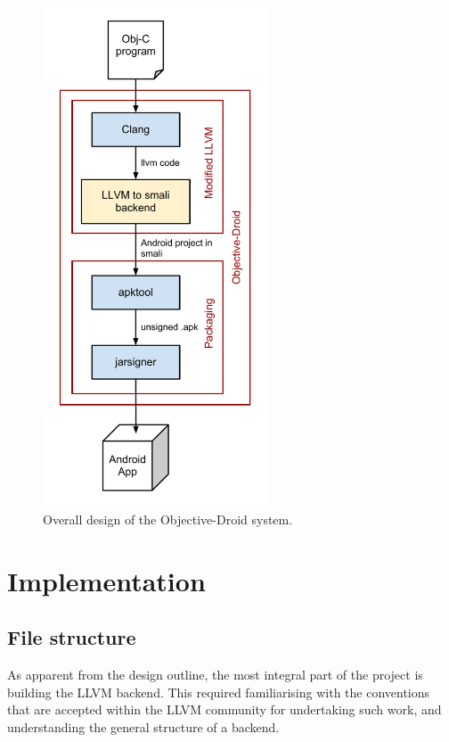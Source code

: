 \documentclass[parskip]{cs4rep}
\begin{document}
\begin{figure}[htp]
  \label{fig:design}
  \caption{Overall design of the Objective-Droid system.}
  \centering
    \includegraphics[width=0.6\textwidth]{design}
\end{figure}

\section{Implementation}

\subsection{File structure}

As apparent from the design outline, the most integral part of the project is building the LLVM backend. This required familiarising with the conventions that are accepted within the LLVM community for undertaking such work, and understanding the general structure of a backend.
\end{document}
